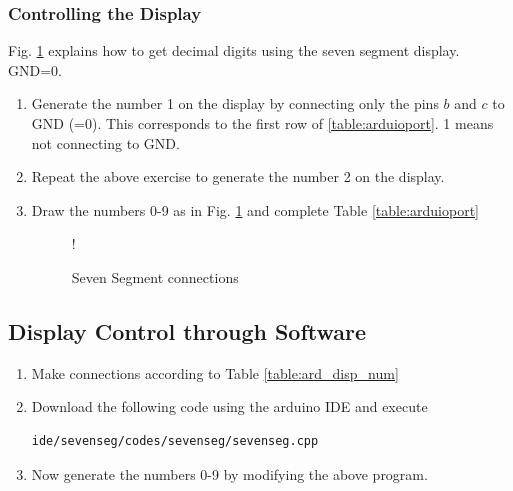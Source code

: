 \subsubsection{Controlling the Display}
Fig. \ref{fig:sevenseg12} explains how to get decimal digits using the seven segment display. GND=0.  
\begin{enumerate}[label=\arabic*.,ref=\theenumi]
\item	Generate the number 1 on the display by connecting only the pins $b$ and $c$ to GND (=0). This corresponds to the  first row of \ref{table:arduioport}. 1 means not connecting to GND.
	
\item
	Repeat the above exercise to generate the number 2 on the display.
	
%
\item
Draw the numbers 0-9 as in Fig. \ref{fig:sevenseg12} and complete Table \ref{table:arduioport}
	
\begin{table}[H]
\centering

\caption{}
\label{table:arduioport}
\end{table}
%
%
\begin{figure}[H]
\begin{center}
 {!} {

}
\end{center}
\caption{Seven Segment connections}
\label{fig:sevenseg12}
\end{figure}
%
\end{enumerate}
\subsection{Display Control through Software}
\begin{enumerate}[label=\arabic*.,ref=\theenumi]
\item
Make connections according to Table \ref{table:ard_disp_num}
\begin{table}
\centering

\caption{}
\label{table:ard_disp_num}
\end{table}

\item
Download the following code using the arduino IDE and execute
%
\begin{lstlisting}
ide/sevenseg/codes/sevenseg/sevenseg.cpp
\end{lstlisting}
%
\item
Now generate the numbers 0-9 by modifying the above program.

\end{enumerate}



